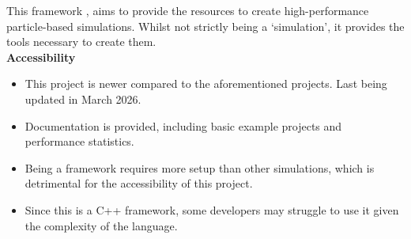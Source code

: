 This framework , aims to provide the resources to create high-performance particle-based simulations. Whilst not strictly being a `simulation', it provides the tools
necessary to create them.
\\
\textbf{Accessibility}

\begin{itemize}
    \item This project is newer compared to the aforementioned projects. Last being updated in March 2026.
    \item Documentation is provided, including basic example projects and performance statistics.
    \item Being a framework requires more setup than other simulations, which is detrimental for the accessibility of this project.
    \item Since this is a C++ framework, some developers may struggle to use it given the complexity of the language.
\end{itemize}